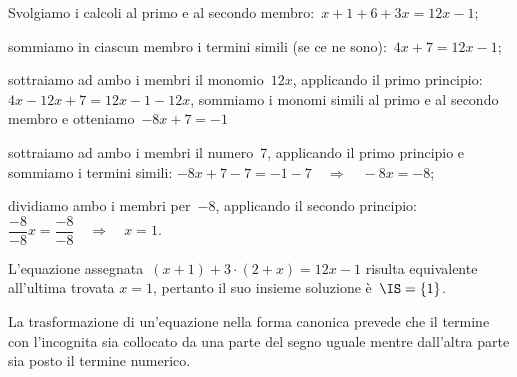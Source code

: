 \begin{exrig}
\begin{esempio}
\begin{enumeratea}
\item Svolgiamo i calcoli al primo e al secondo membro:~$x+1+6+3x=12x-1$;
\item sommiamo in ciascun membro i termini simili (se ce ne sono):~$4x+7=12x-1$;
\item sottraiamo ad ambo i membri il monomio~$12x$, applicando il primo principio:~$4x-12x+7=12x-1-12x$, sommiamo i
monomi simili al primo e al secondo membro e otteniamo~$-8x+7=-1$
\item sottraiamo ad ambo i membri il numero~7, applicando il primo principio e sommiamo i termini simili:
$-8x+7-7=-1-7\quad\Rightarrow\quad -8x=-8$;
\item dividiamo ambo i membri per~$-8$,
applicando il secondo principio:
$\dfrac{-8}{-8}x=\dfrac{-8}{-8}\quad\Rightarrow\quad x=1$.
\end{enumeratea}
L'equazione assegnata~$(x+1)+3\cdot (2+x)=12x-1$
risulta equivalente all'ultima trovata $x=1$, pertanto il
suo insieme soluzione è~$\IS = \{1\}$.
 \end{esempio}
\end{exrig}

\osservazione
La trasformazione di un'equazione nella forma canonica
prevede che il termine con l'incognita sia collocato da
una parte del segno uguale mentre dall'altra parte sia
posto il termine numerico.

